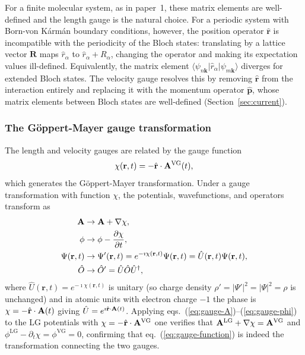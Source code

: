 For a finite molecular system, as in paper~1,\cite{jakowski-rmg-tddft-2025}
these matrix elements are well-defined and
the length gauge is the natural choice.
For a periodic system with Born-von Kármán boundary conditions, however,
the position operator $\hat{\mathbf{r}}$ is incompatible with the
periodicity of the Bloch states: translating by a lattice vector
$\mathbf{R}$ maps $\hat{r}_\alpha$ to $\hat{r}_\alpha + R_\alpha$,
changing the operator and making its expectation values
ill-defined.\cite{resta-1998,king-smith-vanderbilt-1993}
Equivalently, the matrix element
$\langle\psi_{n\mathbf{k}}|\hat{r}_\alpha|\psi_{m\mathbf{k}}\rangle$
diverges for extended Bloch states.
The velocity gauge resolves this by removing $\hat{\mathbf{r}}$ from
the interaction entirely and replacing it with the momentum operator
$\hat{\mathbf{p}}$, whose matrix elements between Bloch states are
well-defined (Section~\ref{sec:current}).

\subsubsection{The Göppert-Mayer gauge transformation}
\label{sec:GM-transform}

The length and velocity gauges are related by the gauge function
\begin{equation}
  \chi(\mathbf{r},t) = -\hat{\mathbf{r}}\cdot\mathbf{A}^\mathrm{VG}(t),
  \label{eq:gauge-function}
\end{equation}
which generates the Göppert-Mayer transformation.\cite{goeppert-mayer-1931}
Under a gauge transformation with function $\chi$, the potentials,
wavefunctions, and operators transform as
\begin{align}
  \mathbf{A} &\to \mathbf{A} + \nabla\chi,
  \label{eq:gauge-A}
  \\
  \phi &\to \phi - \frac{\partial\chi}{\partial t},
  \label{eq:gauge-phi}
  \\
  \Psi(\mathbf{r},t) &\to \Psi'(\mathbf{r},t)
  = e^{-\imath\chi(\mathbf{r},t)}\Psi(\mathbf{r},t)
  = \hat{U}(\mathbf{r},t)\Psi(\mathbf{r},t),
  \label{eq:gauge-psi}
  \\
  \hat{O} &\to \hat{O}' = \hat{U}\hat{O}\hat{U}^\dagger,
  \label{eq:gauge-O}
\end{align}
where $\hat{U}(\mathbf{r},t) = e^{-\imath\chi(\mathbf{r},t)}$
is unitary (so charge density
$\rho'=|\Psi'|^2=|\Psi|^2=\rho$ is unchanged)
and in atomic units with electron charge $-1$ the phase is
$\chi = -\hat{\mathbf{r}}\cdot\mathbf{A}(t)$ giving
$\hat{U} = e^{\imath\hat{\mathbf{r}}\cdot\mathbf{A}(t)}$.
Applying eqs.~(\ref{eq:gauge-A})--(\ref{eq:gauge-phi}) to the
LG potentials with $\chi = -\hat{\mathbf{r}}\cdot\mathbf{A}^\mathrm{VG}$
one verifies that $\mathbf{A}^\mathrm{LG}+\nabla\chi = \mathbf{A}^\mathrm{VG}$
and $\phi^\mathrm{LG} - \partial_t\chi = \phi^\mathrm{VG} = 0$,
confirming that eq.~(\ref{eq:gauge-function}) is indeed the
transformation connecting the two gauges.


